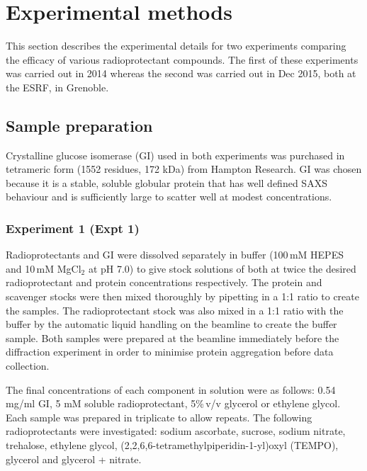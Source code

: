\section{Experimental methods}
\label{sec:Experimental methods - SAXS}
This section describes the experimental details for two experiments comparing the efficacy of various radioprotectant compounds.
The first of these experiments was carried out in 2014 whereas the second was carried out in Dec 2015, both at the ESRF, in Grenoble.

\subsection{Sample preparation}
\label{sub:Sample preparation}
Crystalline glucose isomerase (GI) used in both experiments was purchased in tetrameric form (1552 residues, 172 kDa) from Hampton Research. GI was chosen because it is a stable, soluble globular protein that has well defined SAXS behaviour and is sufficiently large to scatter well at modest concentrations.

\subsubsection{Experiment 1 (Expt 1)}
\label{subs:Experiment 1 - sample prep}
Radioprotectants and GI were dissolved separately in buffer (100$\,$mM HEPES and 10$\,$mM MgCl$_{\text{2}}$ at pH 7.0) to give stock solutions of both at twice the desired radioprotectant and protein concentrations respectively.
The protein and scavenger stocks were then mixed thoroughly by pipetting in a 1:1 ratio to create the samples.
The radioprotectant stock was also mixed in a 1:1 ratio with the buffer by the automatic liquid handling on the beamline to create the buffer sample.
Both samples were prepared at the beamline immediately before the diffraction experiment in order to minimise protein aggregation before data collection.

The final concentrations of each component in solution were as follows:
0.54 mg/ml GI, 5 mM soluble radioprotectant, 5\%$\,$v/v glycerol or ethylene glycol.
Each sample was prepared in triplicate to allow repeats. The following radioprotectants were investigated: sodium ascorbate, sucrose, sodium nitrate, trehalose, ethylene glycol, (2,2,6,6-tetramethylpiperidin-1-yl)oxyl (TEMPO), glycerol and glycerol + nitrate.


